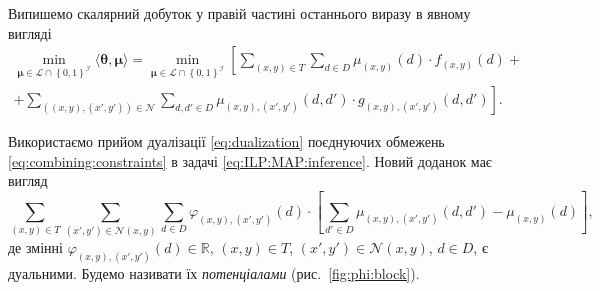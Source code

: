 Випишемо скалярний добуток у правій частині останнього виразу в явному вигляді
\begin{equation} \label{eq:ILP:MAP:inference}
\begin{gathered}
    \min \limits_{\pmb{\mu} \in \mathcal{L} \cap \left\{ 0, 1 \right\}^{\mathcal{I}}}
        \langle \pmb{\theta}, \pmb{\mu} \rangle =
    \min \limits_{\pmb{\mu} \in \mathcal{L} \cap \left\{ 0, 1 \right\}^{\mathcal{I}}}
        \left[
            \sum \limits_{\left(x, y \right) \in T}
                \sum \limits_{d \in D}
                    \mu_{\left(x, y \right)} \left(d \right) \cdot
                    f_{\left(x, y \right)} \left( d \right) + \right. \\
            + \left.
            \sum \limits_{\left(\left(x, y \right), \left(x', y' \right) \right) \in \mathcal{N}}
                \sum \limits_{d, d' \in D}
                    \mu_{\left(x, y \right), \left(x', y' \right)} \left(
                        d, d'
                    \right) \cdot
                    g_{\left(x, y \right), \left(x', y' \right)} \left(
                        d, d'
                    \right)
        \right].
\end{gathered}
\end{equation}

Використаємо прийом дуалізації \eqref{eq:dualization}
поєднуючих обмежень \eqref{eq:combining:constraints}
в задачі \eqref{eq:ILP:MAP:inference}.
Новий доданок має вигляд
\begin{equation} \label{eq:dualized:term}
    \sum \limits_{\left(x, y \right) \in T}
        \sum \limits_{\left(x', y' \right) \in \mathcal{N} \left(x, y \right)}
            \sum \limits_{d \in D}
                \varphi_{\left(x, y \right), \left(x', y' \right)} \left(
                    d
                \right) \cdot \left[
                    \sum \limits_{d' \in D}
                        \mu_{\left(x, y \right), \left(x', y' \right)} \left(
                            d, d'
                        \right) - \mu_{\left(x, y \right)} \left(d \right)
                \right],
\end{equation}
де змінні
$\varphi_{\left(x, y \right), \left(x', y' \right)} \left( d \right) \in
    \mathbb{R}$,
$\left(x, y \right) \in T$,
$\left(x', y' \right) \in \mathcal{N} \left(x, y \right)$,
$d \in D$,
є дуальними.
Будемо називати їх \textit{потенціалами} (рис.~\ref{fig:phi:block}).

